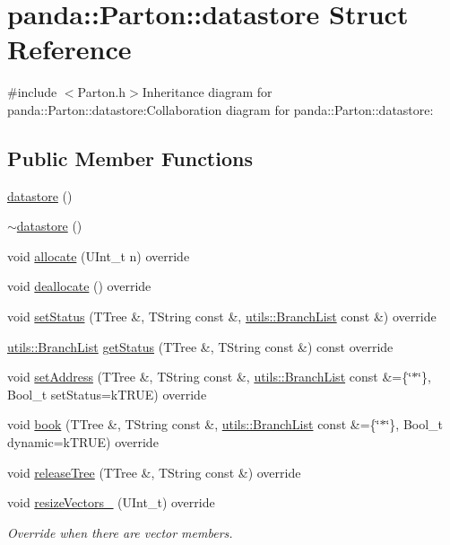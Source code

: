 \hypertarget{structpanda_1_1Parton_1_1datastore}{
\section{panda::Parton::datastore Struct Reference}
\label{structpanda_1_1Parton_1_1datastore}
}


{\ttfamily \#include $<$Parton.h$>$}Inheritance diagram for panda::Parton::datastore:Collaboration diagram for panda::Parton::datastore:\subsection*{Public Member Functions}
\begin{DoxyCompactItemize}
\item 
\hyperlink{structpanda_1_1Parton_1_1datastore_aa447f1603ab6cfdf50e6406d1ef00819}{datastore} ()
\item 
\hyperlink{structpanda_1_1Parton_1_1datastore_aa1e55feb33f97040c324d9ba93126dba}{$\sim$datastore} ()
\item 
void \hyperlink{structpanda_1_1Parton_1_1datastore_ab13044f2228c663b73a6e24f0967a445}{allocate} (UInt\_\-t n) override
\item 
void \hyperlink{structpanda_1_1Parton_1_1datastore_a37d5d064962d581ebccadf6a683b9dc6}{deallocate} () override
\item 
void \hyperlink{structpanda_1_1Parton_1_1datastore_a923a18c356315d4083798fe11bb2c942}{setStatus} (TTree \&, TString const \&, \hyperlink{classpanda_1_1utils_1_1BranchList}{utils::BranchList} const \&) override
\item 
\hyperlink{classpanda_1_1utils_1_1BranchList}{utils::BranchList} \hyperlink{structpanda_1_1Parton_1_1datastore_af82916b07ec783b268c2491cd5b374be}{getStatus} (TTree \&, TString const \&) const override
\item 
void \hyperlink{structpanda_1_1Parton_1_1datastore_a2348c36dbc9d5f769fac19fcb9582e5a}{setAddress} (TTree \&, TString const \&, \hyperlink{classpanda_1_1utils_1_1BranchList}{utils::BranchList} const \&=\{\char`\"{}$\ast$\char`\"{}\}, Bool\_\-t setStatus=kTRUE) override
\item 
void \hyperlink{structpanda_1_1Parton_1_1datastore_ae8dc1e83cadb773ac9c7a3f14dea85b3}{book} (TTree \&, TString const \&, \hyperlink{classpanda_1_1utils_1_1BranchList}{utils::BranchList} const \&=\{\char`\"{}$\ast$\char`\"{}\}, Bool\_\-t dynamic=kTRUE) override
\item 
void \hyperlink{structpanda_1_1Parton_1_1datastore_affc6fef2d7648b73182dbb91d5043b36}{releaseTree} (TTree \&, TString const \&) override
\item 
void \hyperlink{structpanda_1_1Parton_1_1datastore_a85ed8f023c9fddb6ada93150e4d03c22}{resizeVectors\_\-} (UInt\_\-t) override
\begin{DoxyCompactList}\small\item\em Override when there are vector members. \item\end{DoxyCompactList}\end{DoxyCompactItemize}


